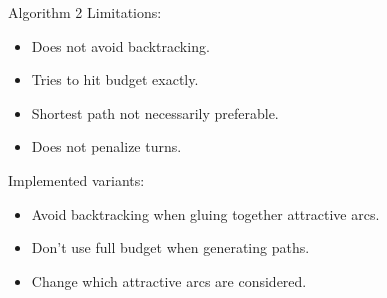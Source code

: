 \documentclass{beamer}
\begin{document}
\begin{frame}{Algorithm 2 \cite{lu2015arc}}
    Limitations:
    \begin{itemize}
        \item Does not avoid backtracking.
        \item Tries to hit budget exactly.
        \item Shortest path not necessarily preferable.
        \item Does not penalize turns. 
    \end{itemize}
    \vspace{0.3cm}
    Implemented variants:
    \begin{itemize}
        \item Avoid backtracking when gluing together attractive arcs.
        \item Don't use full budget when generating paths.
        \item Change which attractive arcs are considered.
    \end{itemize}
    
\end{frame}

%
%
\end{document}
